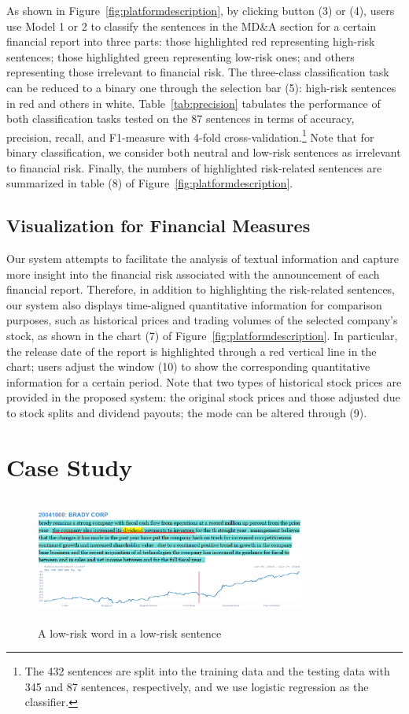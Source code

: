 \documentclass[10pt,conference,letterpaper]{IEEEtran}
\begin{document}
    As shown in Figure~\ref{fig:platformdescription}, by clicking button (3) or (4), users use Model 1 or 2 to classify the sentences in the MD\&A section for a certain financial report into three parts: those highlighted red representing high-risk sentences; those highlighted green representing low-risk ones; and others representing those irrelevant to financial risk. The three-class classification task can be reduced to a binary one through the selection bar (5): high-risk sentences in red and others in white. Table~\ref{tab:precision} tabulates the performance of both classification tasks tested on the 87 sentences in terms of accuracy, precision, recall, and F1-measure with 4-fold cross-validation.\footnote{The 432 sentences are split into the training data and the testing data with 345 and 87 sentences, respectively, and we use logistic regression as the classifier.} Note that for binary classification, we consider both neutral and low-risk sentences as irrelevant to financial risk. Finally, the numbers of highlighted risk-related sentences are summarized in table (8) of Figure~\ref{fig:platformdescription}.

\subsection{Visualization for Financial Measures}
    Our system attempts to facilitate the analysis of textual information and capture more insight into the financial risk associated with the announcement of each financial report. Therefore, in addition to highlighting the risk-related sentences, our system also displays time-aligned quantitative information for comparison purposes, such as historical prices and trading volumes of the selected company's stock, as shown in the chart (7) of Figure~\ref{fig:platformdescription}. In particular, the release date of the report is highlighted through a red vertical line in the chart; users adjust the window (10) to show the corresponding quantitative information for a certain period. Note that two types of historical stock prices are provided in the proposed system: the original stock prices and those adjusted due to stock splits and dividend payouts; the mode can be altered through (9).

\section{Case Study}\label{sec:case}

\begin{figure}[tbh]
\includegraphics[height=1.65in, width=3.5in]{fig/dividend_positive.png}
\caption{A low-risk word
in a low-risk sentence} \label{fig:dividend_lowrisksentence}
\end{figure}
\end{document}
